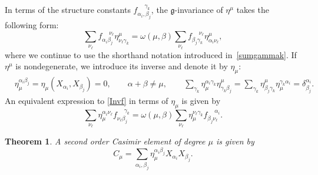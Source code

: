 \documentclass[10pt,a4paper]{amsart}
\numberwithin{equation}{section}
\newtheorem{Theorem}{Theorem}[section]
\theoremstyle{definition}
\def\g{\mathfrak{g}}
\begin{document}
In terms of the structure constants $f_{\alpha_i, \beta_j}^{\quad\ \gamma_k}$, the $\g$-invariance of $\eta^{\mu}$ takes the following form:
\begin{equation}
	\sum_{\nu_{\ell}}
	f_{\alpha_i \beta_j}^{\quad \ \nu_{\ell}} \eta^{\mu}_{\nu_{\ell}\gamma_k}
	=
	\omega(\mu,\beta)
	\sum_{\nu_{\ell}}
	f_{\beta_j \gamma_k}^{\quad \ \nu_{\ell}} \eta^{\mu}_{\alpha_i \nu_{\ell}},
	\label{Invf}
\end{equation}
where we continue to use the shorthand notation introduced in~\eqref{sumgammak}.
If $\eta^{\mu}$ is nondegenerate, we introduce its inverse and denote it by $ \eta_{\mu}$:
\begin{align*}
	 &\eta_{\mu}^{\alpha_i \beta_j}=\eta_{\mu}(X_{\alpha_i}, X_{\beta_j}) = 0,\qquad \alpha + \beta \neq \mu,
	\qquad
	 \sum_{\gamma_k } \eta_{\mu}^{\alpha_i \gamma_k} \eta^{\mu}_{\gamma_k \beta_j}=\sum_{\gamma_k}
	\eta^{\mu}_{\beta_j \gamma_k} \eta_{\mu}^{\gamma_k \alpha_i} = \delta^{\alpha_i}_{\beta_j}.
\end{align*}
An equivalent expression to \eqref{Invf} in terms of $\eta_{\mu}$ is given by
\begin{equation}
	\sum_{\nu_{\ell}}
	\eta_{\mu}^{\alpha_i \nu_{\ell}} f_{\nu_{\ell} \beta_j}^{\quad \ \gamma_k}
	= \omega(\mu,\beta)
	\sum_{\nu_{\ell}}
	\eta_{\mu}^{\nu_{\ell} \gamma_k} f_{\beta_j \nu_{\ell}}^{\quad\ \alpha_i}.
	\label{Invf2}
\end{equation}

\begin{Theorem}
	A second order Casimir element of degree $\mu$ is given by
	\begin{equation*}
		C_{\mu} = \sum_{\alpha_i,\beta_j} \eta_{\mu}^{\alpha_i \beta_j} X_{\alpha_i} X_{\beta_j}.
	\end{equation*}
\end{Theorem}
\end{document}
